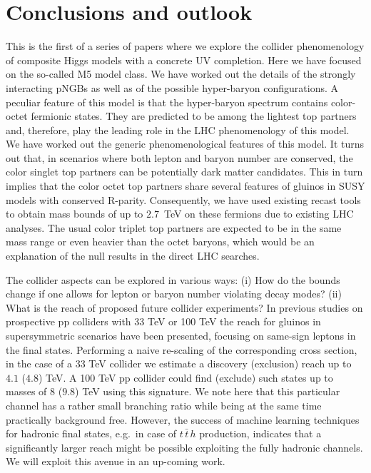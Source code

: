 \documentclass[preprintnumbers,nofootinbib,showpacs,eqsecnum,pre,12pt]{revtex4-1}
\begin{document}
\section{Conclusions and outlook} \label{sec:outlook}

This is the first of a series of papers where we explore the collider phenomenology of
composite Higgs models with a concrete UV completion. Here we have focused on the 
so-called M5 model class. We have worked out the details of the strongly interacting
pNGBs as well as of the possible hyper-baryon configurations.
A peculiar feature of this model is that the hyper-baryon spectrum contains color-octet fermionic states. They are predicted to be among the lightest top partners
and, therefore, play the leading role in the LHC phenomenology of this model. We have worked out
the generic phenomenological features of this model.  It turns out
that, in scenarios where both lepton and baryon number are conserved, the color singlet
top partners can be potentially dark matter candidates. This in turn implies that the color
octet top partners share several features of gluinos in SUSY models with conserved R-parity. Consequently, we have used existing recast tools to obtain mass bounds of up to
$2.7$~TeV  on these fermions due to existing LHC analyses. The usual color triplet top partners are expected to be in the same mass range or even  heavier
than the octet baryons, which would be an explanation of the null results in the direct
LHC searches.

The collider aspects can be explored in various ways: (i) How do the bounds change if
one allows for lepton or baryon number violating decay modes? (ii) What is the reach
of proposed future collider experiments? In previous studies on prospective pp colliders
with 33 TeV or 100 TeV  \cite{Golling:2016gvc} the reach for gluinos in supersymmetric
scenarios have been presented, focusing on same-sign leptons in the final states.
Performing a naive re-scaling of the corresponding cross section, in the case
of a 33 TeV collider we estimate a discovery (exclusion) reach up to $4.1$ ($4.8$) TeV. A 100 TeV
pp collider could find (exclude) such states up to masses of $8$ ($9.8$) TeV using this
signature. We note here that this particular channel has a rather small branching ratio while being
at the same time practically background free. However, the success of machine learning
techniques for hadronic final states, e.g.~in case of $t\,\bar{t}\,h$ production, indicates that
a significantly larger reach might be possible exploiting the fully hadronic channels. We will exploit this avenue in an up-coming work.
\end{document}
